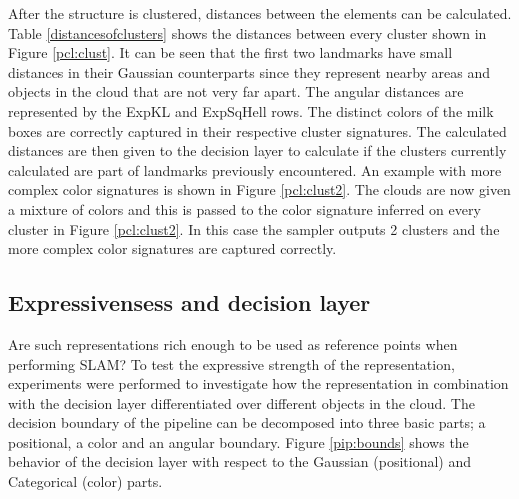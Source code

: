 \documentclass [twoside,hidelinks]{article}
\begin{document}
After the structure is clustered, distances between the elements can be calculated. Table \ref{distancesofclusters} shows the distances between every cluster shown in Figure \ref{pcl:clust}. It can be seen that the first two landmarks have small distances in their Gaussian counterparts since they represent nearby areas and objects in the cloud that are not very far apart. The angular distances are represented by the ExpKL and ExpSqHell rows. The distinct colors of the milk boxes are correctly captured in their respective cluster signatures. The calculated distances are then given to the decision layer to calculate if the clusters currently calculated are part of landmarks previously encountered.
An example with more complex color signatures is shown in Figure \ref{pcl:clust2}. The clouds are now given a mixture of colors and this is passed to the color signature inferred on every cluster in Figure \ref{pcl:clust2}. In this case the sampler outputs 2 clusters and the more complex color signatures are captured correctly. 

\subsection{Expressivensess and decision layer}

Are such representations rich enough to be used as reference points when performing SLAM?
To test the expressive strength of the representation, experiments were performed to investigate how the representation in combination with the decision layer differentiated over different objects in the cloud. 
The decision boundary of the pipeline can be decomposed into three basic parts; a positional, a color and an angular boundary. Figure \ref{pip:bounds} shows the behavior of the decision layer with respect to the Gaussian (positional) and Categorical (color) parts. 
    
\end{document}
